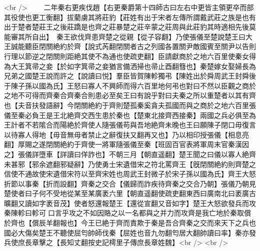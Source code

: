 <br />
　　二年秦右更疾伐趙【右更秦爵第十四師古曰左右中更皆主領更卒而部其役使也更工衡翻】拔藺虜其將莊豹【莊姓有出于宋者左傳所謂戴武莊之族是也有出于楚者楚莊王之後莊蹻是也齊之莊暴楚之莊辛蒙之莊周與此莊豹其時適相先後莫能審其所自出】　秦王欲伐齊患齊楚之從親【從子容翻】乃使張儀至楚說楚王曰大王誠能聽臣閉關絶約於齊【說式芮翻閉關者古之列國各置關尹敵國賓至關尹以告則行理以節逆之閉關則距絶其使不為通也使疏吏翻】臣請獻商於之地六百里使秦女得為大王箕帚之妾【於如字箕帚之妾猶言備洒掃也帚止酉翻篲也】秦楚嫁女娶婦長為兄弟之國楚王說而許之【說讀曰悦】羣臣皆賀陳軫獨弔【陳姓出於舜周武王封舜後于陳子孫以國為氏】王怒曰寡人不興師而得六百里地何弔也對曰不然以臣觀之商於之地不可得而齊秦合齊秦合則患必至矣王曰有說乎對曰夫秦之所以重楚者以其有齊也【夫音扶發語辭】今閉關絶約于齊則楚孤秦奚貪夫孤國而與之商於之地六百里張儀至秦必負王是王北絶齊交西生患於秦也【楚東北接齊西接秦】兩國之兵必俱至為王計者不若隂合而陽絶於齊使人隨張儀苟與吾地絶齊未晚也王曰願陳子閉口毋復言以待寡人得地【毋音無毋者禁止之辭復扶又翻再又也】乃以相印授張儀【相息亮翻】厚賜之遂閉關絶約于齊使一將軍隨張儀至秦【班固百官表將軍周末官秦漢因之】張儀詳墮車【詳讀曰佯詐也】不朝三月【朝直遥翻】楚王聞之曰儀以寡人絶齊未甚邪【邪余遮翻邪疑辭】乃使勇士宋遺借宋之符北罵齊王【旣閉關絶約則齊楚之信使不通故使宋遺借宋符以至齊宋姓也周武王封微子於宋子孫以國為氏】齊王大怒折節以事秦【折而設翻】齊秦之交合【儀歸而詐疾待齊秦之交合乃朝】張儀乃朝見楚使者曰子何不受地從某至某廣袤六里【朝直遥翻使疏吏翻東西曰廣南北曰袤廣古曠翻又讀如字袤音茂】使者怒還報楚王【還從宣翻又音如字】楚王大怒欲發兵而攻秦陳軫曰軫可口言乎攻之不如因賂之以一名都與之并力而攻齊是我亡地於秦取償於齊也【償辰羊翻報也】今王已絶于齊而責欺于秦是吾合齊秦之交而來天下之兵也國必大傷矣楚王不聽使屈匄帥師伐秦【屈姓也音九勿翻匄居大翻帥讀曰率】秦亦發兵使庶長章擊之【長知丈翻按史記樗里子傳庶長章姓魏】<br />
<br />
